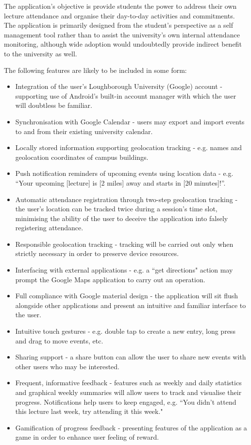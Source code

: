 \documentclass{article}
\begin{document}
The application's objective is provide students the power to address their own lecture attendance and organise their day-to-day activities and commitments. The application is primarily designed from the student's perspective as a self management tool rather than to assist the university's own internal attendance monitoring, although wide adoption would undoubtedly provide indirect benefit to the university as well.

The following features are likely to be included in some form:

\begin{itemize}
    \item Integration of the user's Loughborough University (Google) account - supporting use of Android's built-in account manager with which the user will doubtless be familiar.
    \item Synchronisation with Google Calendar - users may export and import events to and from their existing university calendar.
    \item Locally stored information supporting geolocation tracking - e.g. names and geolocation coordinates of campus buildings.
    \item Push notification reminders of upcoming events using location data - e.g. ``Your upcoming [lecture] is [2 miles] away and starts in [20 minutes]!''.
    \item Automatic attendance registration through two-step geolocation tracking - the user's location can be tracked twice during a session's time slot, minimising the ability of the user to deceive the application into falsely registering attendance. 
    \item Responsible geolocation tracking - tracking will be carried out only when strictly necessary in order to preserve device resources.
    \item Interfacing with external applications - e.g. a ``get directions" action may prompt the Google Maps application to carry out an operation.
    \item Full compliance with Google material design - the application will sit flush alongside other applications and present an intuitive and familiar interface to the user.
    \item Intuitive touch gestures - e.g. double tap to create a new entry, long press and drag to move events, etc.
    \item Sharing support - a share button can allow the user to share new events with other users who may be interested.
    \item Frequent, informative feedback - features such as weekly and daily statistics and graphical weekly summaries will allow users to track and visualise their progress. Notifications help users to keep engaged, e.g. ``You didn't attend this lecture last week, try attending it this week."
    \item Gamification of progress feedback - presenting features of the application as a game in order to enhance user feeling of reward.
\end{itemize}
\end{document}
